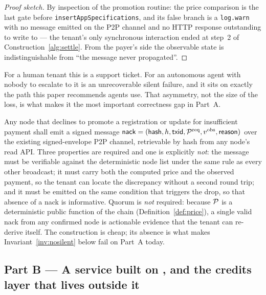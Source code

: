 \begin{proof}[Proof sketch]
By inspection of the promotion routine: the price comparison is the last gate before
\texttt{insert\allowbreak{}App\allowbreak{}Specifications}, and its false branch is a \texttt{log.warn} with no message emitted
on the P2P channel and no HTTP response outstanding to write to --- the tenant's only synchronous
interaction ended at step~2 of Construction~\ref{alg:settle}. From the payer's side the observable
state is indistinguishable from ``the message never propagated''.
\end{proof}

For a human tenant this is a support ticket. For an autonomous agent with nobody to escalate to it is
an unrecoverable silent failure, and it sits on exactly the path this paper recommends agents use.
That asymmetry, not the size of the loss, is what makes it the most important correctness gap in
Part~A.

\begin{remark}
\label{req:nack}
Any node that declines to promote a registration or update for insufficient payment shall emit a
signed message
$\mathsf{nack} = (\mathsf{hash}, h, \mathsf{txid}, \mathcal{P}^{\mathrm{req}}, v^{\mathrm{obs}},
\mathsf{reason})$
over the existing signed-envelope P2P channel, retrievable by hash from any node's read API. Three
properties are required and one is explicitly \emph{not}: the message must be verifiable against the
deterministic node list under the same rule as every other broadcast; it must carry both the computed
price and the observed payment, so the tenant can locate the discrepancy without a second round trip;
and it must be emitted on the same condition that triggers the drop, so that absence of a
\textsf{nack} is informative. Quorum is \emph{not} required: because $\mathcal{P}$ is a deterministic
public function of the chain (Definition~\ref{def:price}), a single valid \textsf{nack} from any
confirmed node is actionable evidence that the tenant can re-derive itself. The construction is
cheap; its absence is what makes Invariant~\ref{inv:nosilent} below fail on Part~A today.
\end{remark}

\subsection{Part B --- A service built on \Flux, and the credits layer that lives outside it}
\label{sec:paying:credits}

